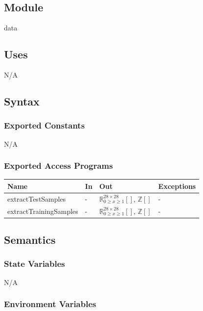 \documentclass[12pt, titlepage]{article}
\begin{document}
\subsection{Module}

data
\subsection{Uses}

N/A

\subsection{Syntax}

\subsubsection{Exported Constants}

N/A

\subsubsection{Exported Access Programs}


\begin{center}
\begin{tabular}{p{5cm} p{2cm} p{4cm} p{2cm}}
\hline
\textbf{Name} & \textbf{In} & \textbf{Out} & \textbf{Exceptions} \\
\hline
extractTestSamples & - & ${\mathbb{R}^{28 \times 28}_{0 \ge x \ge 1}[]}$, ${\mathbb{Z}[]}$ & - \\
extractTrainingSamples & - & ${\mathbb{R}^{28 \times 28}_{0 \ge x \ge 1}[]}$, ${\mathbb{Z}[]}$ & - \\
\hline
\end{tabular}
\end{center}

\subsection{Semantics}

\subsubsection{State Variables}

N/A

\subsubsection{Environment Variables}
\end{document}
